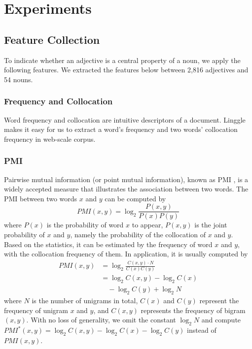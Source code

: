 \section{Experiments}

\subsection{Feature Collection}
To indicate whether an adjective is a central property of a noun, we apply the following features. 
We extracted the features below between 2,816 adjectives and 54 nouns. 

\subsubsection{Frequency and Collocation}
Word frequency and collocation are intuitive descriptors of a document. Linggle \cite{boisson2013linggle} makes it easy for us to extract a word's frequency and two words' collocation frequency in web-scale corpus. 
\subsubsection{PMI}
Pairwise mutual information (or point mutual information), known as PMI \cite{church1990word, bouma2009normalized}, is a widely accepted measure that illustrates the association between two words. 
The PMI between two words $x$ and $y$ can be computed by 
\begin{equation}
PMI(x, y) = \log_2 \frac{P(x,y)}{P(x)P(y)}
\end{equation}
where $P(x)$ is the probability of word $x$ to appear, 
$P(x,y)$ is the joint probability of $x$ and $y$, namely the probability of the collocation of $x$ and $y$. 
Based on the statistics, it can be estimated by the frequency of word $x$ and $y$,  with the collocation frequency of them. 
In application, it is usually computed by 
\begin{equation}
\begin{aligned}
PMI(x,y) &= \log_2 \frac{C(x,y) \cdot N}{C(x)C(y)}  \\
 &= \log_2{C(x,y)} - \log_2{C(x)} \\ 
 & \quad - \log_2{C(y)} + \log_2 N
\end{aligned}
\end{equation}
where $N$ is the number of unigrams in total, 
$C(x)$ and $C(y)$ represent the frequency of unigram $x$ and $y$, 
and $C(x,y)$ represents the frequency of bigram $(x, y)$. 
With no loss of generality, we omit the constant $\log_2 N$ and compute $PMI^{*}(x,y) = \log_2{C(x,y)} - \log_2{C(x)} - \log_2{C(y)}$ instead of $PMI(x,y)$.

